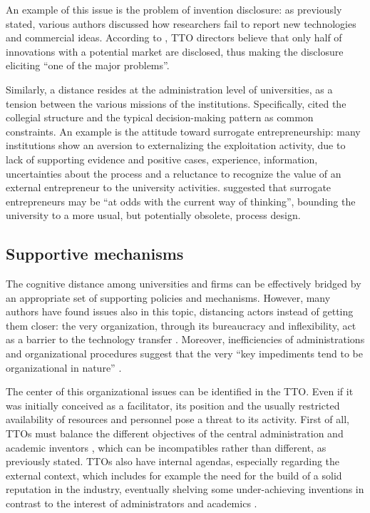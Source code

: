 An example of this issue is the problem of invention disclosure: as previously stated, various authors discussed how researchers fail to report new technologies and commercial ideas. According to \citet{Jensen2003}, TTO directors believe that only half of innovations with a potential market are disclosed, thus making the disclosure eliciting \enquote{one of the major problems}.

Similarly, a distance resides at the administration level of universities, as a tension between the various missions of the institutions. Specifically, \citet{Guerrero2014} cited the collegial structure and the typical decision-making pattern as common constraints. An example is the attitude toward surrogate entrepreneurship: many institutions show an aversion to externalizing the exploitation activity, due to lack of supporting evidence and positive cases, experience, information, uncertainties about the process and a reluctance to recognize the value of an external entrepreneur to the university activities. \citet{Franklin2001} suggested that surrogate entrepreneurs may be \enquote{at odds with the current way of thinking}, bounding the university to a more usual, but potentially obsolete, process design. 

\subsection{Supportive mechanisms}

The cognitive distance among universities and firms can be effectively bridged by an appropriate set of supporting policies and mechanisms. However, many authors have found issues also in this topic, distancing actors instead of getting them closer: the very organization, through its bureaucracy and inflexibility, act as a barrier to the technology transfer \citep{Siegel2003a}. Moreover, inefficiencies of administrations and organizational procedures \citep{Baldini2007} suggest that the very \enquote{key impediments tend to be organizational in nature} \citep{Siegel2007}. 

The center of this organizational issues can be identified in the TTO. Even if it was initially conceived as a facilitator, its position and the usually restricted availability of resources and personnel pose a threat to its activity. First of all, TTOs must balance the different objectives of the central administration and academic inventors \citep{Jensen2003}, which can be incompatibles rather than different, as previously stated. TTOs also have internal agendas, especially regarding the external context, which includes for example the need for the build of a solid reputation in the industry, eventually shelving some under-achieving inventions in contrast to the interest of administrators and academics \citep{Siegel2007}. 

